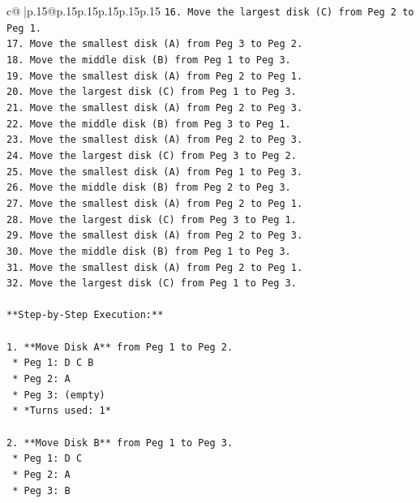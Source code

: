 \documentclass{article}
\begin{document}
{\begin{supertabular}{c@{$\;$}|p{.15\linewidth}@{}p{.15\linewidth}p{.15\linewidth}p{.15\linewidth}p{.15\linewidth}p{.15\linewidth}}
{{{\texttt{16. Move the largest disk (C) from Peg 2 to Peg 1.} \\
\texttt{17. Move the smallest disk (A) from Peg 3 to Peg 2.} \\
\texttt{18. Move the middle disk (B) from Peg 1 to Peg 3.} \\
\texttt{19. Move the smallest disk (A) from Peg 2 to Peg 1.} \\
\texttt{20. Move the largest disk (C) from Peg 1 to Peg 3.} \\
\texttt{21. Move the smallest disk (A) from Peg 2 to Peg 3.} \\
\texttt{22. Move the middle disk (B) from Peg 3 to Peg 1.} \\
\texttt{23. Move the smallest disk (A) from Peg 2 to Peg 3.} \\
\texttt{24. Move the largest disk (C) from Peg 3 to Peg 2.} \\
\texttt{25. Move the smallest disk (A) from Peg 1 to Peg 3.} \\
\texttt{26. Move the middle disk (B) from Peg 2 to Peg 3.} \\
\texttt{27. Move the smallest disk (A) from Peg 2 to Peg 1.} \\
\texttt{28. Move the largest disk (C) from Peg 3 to Peg 1.} \\
\texttt{29. Move the smallest disk (A) from Peg 2 to Peg 3.} \\
\texttt{30. Move the middle disk (B) from Peg 1 to Peg 3.} \\
\texttt{31. Move the smallest disk (A) from Peg 2 to Peg 1.} \\
\texttt{32. Move the largest disk (C) from Peg 1 to Peg 3.} \\
\\ 
\texttt{**Step{-}by{-}Step Execution:**} \\
\\ 
\texttt{1.  **Move Disk A** from Peg 1 to Peg 2.} \\
\texttt{    *   Peg 1: D C B} \\
\texttt{    *   Peg 2: A} \\
\texttt{    *   Peg 3: (empty)} \\
\texttt{    *   *Turns used: 1*} \\
\\ 
\texttt{2.  **Move Disk B** from Peg 1 to Peg 3.} \\
\texttt{    *   Peg 1: D C} \\
\texttt{    *   Peg 2: A} \\
\texttt{    *   Peg 3: B} \\
}}}
\end{supertabular}}
\end{document}
